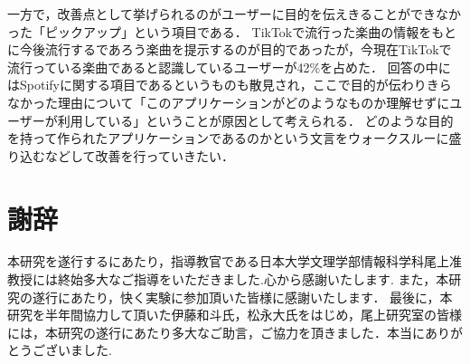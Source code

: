 \documentclass[titlepage]{jsreport}
\begin{document}
一方で，改善点として挙げられるのがユーザーに目的を伝えきることができなかった「ピックアップ」という項目である．
TikTokで流行った楽曲の情報をもとに今後流行するであろう楽曲を提示するのが目的であったが，今現在TikTokで流行っている楽曲であると認識しているユーザーが42\%を占めた． 
回答の中にはSpotifyに関する項目であるというものも散見され，ここで目的が伝わりきらなかった理由について「このアプリケーションがどのようなものか理解せずにユーザーが利用している」ということが原因として考えられる．
どのような目的を持って作られたアプリケーションであるのかという文言をウォークスルーに盛り込むなどして改善を行っていきたい． 

\chapter*{謝辞}
本研究を遂行するにあたり，指導教官である日本大学文理学部情報科学科尾上准教授には終始多大なご指導をいただきました.心から感謝いたします.
また，本研究の遂行にあたり，快く実験に参加頂いた皆様に感謝いたします．
最後に，本研究を半年間協力して頂いた伊藤和斗氏，松永大氏をはじめ，尾上研究室の皆様には，本研究の遂行にあたり多大なご助言，ご協力を頂きました．本当にありがとうございました.
\end{document}
